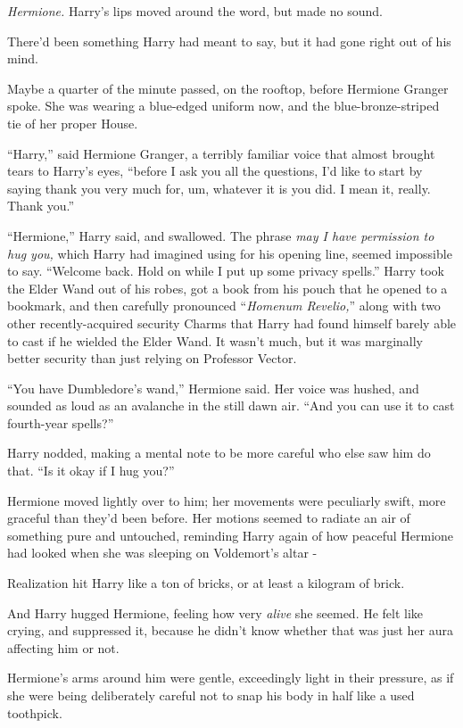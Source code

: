 \emph{Hermione.} Harry's lips moved around the word, but made no sound.

There'd been something Harry had meant to say, but it had gone right out of his mind.

Maybe a quarter of the minute passed, on the rooftop, before Hermione Granger spoke. She was wearing a blue-edged uniform now, and the blue-bronze-striped tie of her proper House.

``Harry,'' said Hermione Granger, a terribly familiar voice that almost brought tears to Harry's eyes, ``before I ask you all the questions, I'd like to start by saying thank you very much for, um, whatever it is you did. I mean it, really. Thank you.''

``Hermione,'' Harry said, and swallowed. The phrase \emph{may I have permission to hug you,} which Harry had imagined using for his opening line, seemed impossible to say. ``Welcome back. Hold on while I put up some privacy spells.'' Harry took the Elder Wand out of his robes, got a book from his pouch that he opened to a bookmark, and then carefully pronounced ``\emph{Homenum Revelio,}'' along with two other recently-acquired security Charms that Harry had found himself barely able to cast if he wielded the Elder Wand. It wasn't much, but it was marginally better security than just relying on Professor Vector.

``You have Dumbledore's wand,'' Hermione said. Her voice was hushed, and sounded as loud as an avalanche in the still dawn air. ``And you can use it to cast fourth-year spells?''

Harry nodded, making a mental note to be more careful who else saw him do that. ``Is it okay if I hug you?''

Hermione moved lightly over to him; her movements were peculiarly swift, more graceful than they'd been before. Her motions seemed to radiate an air of something pure and untouched, reminding Harry again of how peaceful Hermione had looked when she was sleeping on Voldemort's altar -

Realization hit Harry like a ton of bricks, or at least a kilogram of brick.

And Harry hugged Hermione, feeling how very \emph{alive} she seemed. He felt like crying, and suppressed it, because he didn't know whether that was just her aura affecting him or not.

Hermione's arms around him were gentle, exceedingly light in their pressure, as if she were being deliberately careful not to snap his body in half like a used toothpick.

